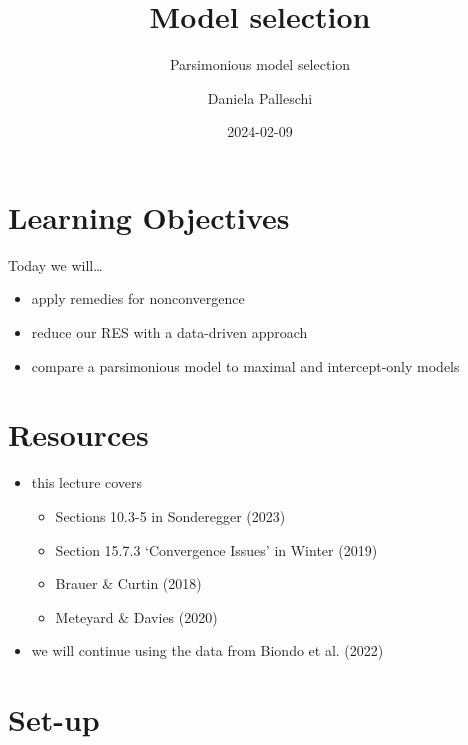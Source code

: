 \documentclass[
  letterpaper,
  DIV=11,
  numbers=noendperiod]{scrartcl}
\title{Model selection}
\subtitle{Parsimonious model selection}
\author{Daniela Palleschi}
\date{2024-02-09}
\providecommand{\tightlist}{%
  \setlength{\itemsep}{0pt}\setlength{\parskip}{0pt}}\usepackage{longtable,booktabs,array}
\renewcommand*\contentsname{Table of contents}
\newcommand\contentsname{Table of contents}
\begin{document}
\maketitle
\ifdefined\Shaded\renewenvironment{Shaded}{\begin{tcolorbox}[boxrule=0pt, interior hidden, breakable, borderline west={3pt}{0pt}{shadecolor}, frame hidden, enhanced, sharp corners]}{\end{tcolorbox}}\fi

\renewcommand*\contentsname{Table of contents}
{
\hypersetup{linkcolor=}
\setcounter{tocdepth}{3}
\tableofcontents
}
\hypertarget{learning-objectives}{%
\section*{Learning Objectives}\label{learning-objectives}}

Today we will\ldots{}

\begin{itemize}
\tightlist
\item
  apply remedies for nonconvergence
\item
  reduce our RES with a data-driven approach
\item
  compare a parsimonious model to maximal and intercept-only models
\end{itemize}

\hypertarget{resources}{%
\section*{Resources}\label{resources}}

\begin{itemize}
\tightlist
\item
  this lecture covers

  \begin{itemize}
  \tightlist
  \item
    Sections 10.3-5 in Sonderegger (2023)
  \item
    Section 15.7.3 `Convergence Issues' in Winter (2019)
  \item
    Brauer \& Curtin (2018)
  \item
    Meteyard \& Davies (2020)
  \end{itemize}
\item
  we will continue using the data from Biondo et al. (2022)
\end{itemize}

\hypertarget{set-up}{%
\section*{Set-up}\label{set-up}}
\end{document}

